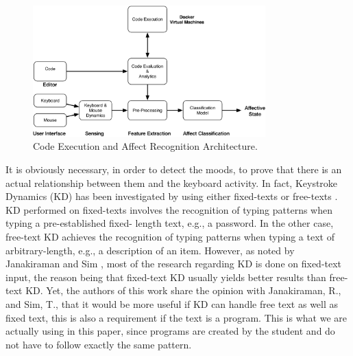 \documentclass[a4paper,twoside]{article}
\begin{document}
\begin{figure}[h!tbp]
\centering
\includegraphics[width=0.80\textwidth]{KMDAffective.png}
\caption{Code Execution and Affect Recognition Architecture.}
\label{fig_process}
\end{figure}

It is obviously necessary, in order to detect the moods, to prove that
there is an actual relationship between them and the keyboard
activity. In fact, Keystroke Dynamics (KD) has been investigated  by using either
fixed-texts or free-texts \cite{gunetti2005keystroke}.
KD performed on fixed-texts
involves the recognition of typing patterns when typing a pre-established fixed-
length text, e.g., a password. In the other case, free-text KD achieves the
recognition of typing patterns when typing a text of arbitrary-length, e.g., a
description of an item. However, as noted by Janakiraman and Sim
\cite{janakiraman2007keystroke}, most of 
the research regarding KD is done on fixed-text input, the reason being that
fixed-text KD usually yields better results than free-text KD. Yet, the authors
of this work share the opinion with Janakiraman, R., and Sim, T., that it would
 be more useful if KD can handle free text as well as fixed text, this is also a
 requirement if the text is a program. This is what we are actually
 using in this paper, since programs are created by the student and do
 not have to follow exactly the same pattern. 
\end{document}
